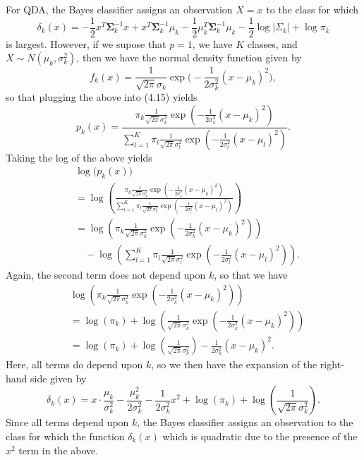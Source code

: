 For QDA, the Bayes classifier assigns an observation $X = x$ to the class for
which
\[
    \delta_k(x) = -\frac{1}{2}x^T \mathbf{\Sigma}_k^{-1}x
    + x^T \mathbf{\Sigma}_k^{-1}\mu_k
    - \frac{1}{2} \mu_k^T \mathbf{\Sigma}_k^{-1}\mu_k
    - \frac{1}{2}\log{\lvert \Sigma_k \rvert} + \log{\pi_k}
\]
is largest. However, if we supose that $p = 1$, we have $K$ classes, and
$X \sim N(\mu_k, \sigma_k^2)$, then we have the normal density function given
by
\[
    f_k(x) = \frac{1}{\sqrt{2\pi}\sigma_k}
    \exp{\biggl(-\frac{1}{2\sigma_k^2}{(x - \mu_k)}^2\biggr)},
\]
so that plugging the above into (4.15) yields
\[
    p_k(x) = \frac{\pi_k \frac{1}{\sqrt{2\pi}\sigma_k^2}
        \exp{\left(-\frac{1}{2\sigma_k^2}{(x - \mu_k)}^2\right)}}
        {\sum_{l=1}^K{\pi_l \frac{1}{\sqrt{2\pi}\sigma_l^2}
    \exp{\left(-\frac{1}{2\sigma_l^2}{(x - \mu_l)}^2\right)}}}.
\]
Taking the log of the above yields
\begin{equation*}
    \begin{split}
        & \log{\bigl(p_k(x)\bigr)} \\
        &= \log{\left(\frac{\pi_k \frac{1}{\sqrt{2\pi}\sigma_k^2}
                    \exp{\left(-\frac{1}{2\sigma_k^2}{(x - \mu_k)}^2\right)}}
                    {\sum_{l=1}^K{\pi_l \frac{1}{\sqrt{2\pi}\sigma_l^2}
        \exp{\left(-\frac{1}{2\sigma_l^2}{(x - \mu_l)}^2\right)}}}\right)} \\
        &= \log{\left(\pi_k \frac{1}{\sqrt{2\pi}\sigma_k^2}
        \exp{\left(-\frac{1}{2\sigma_k^2}{(x - \mu_k)}^2\right)}\right)} \\
        &\quad - \log{\left(\sum_{l=1}^K{\pi_l \frac{1}{\sqrt{2\pi}\sigma_l^2}
        \exp{\left(-\frac{1}{2\sigma_l^2}{(x - \mu_l)}^2\right)}}\right)}.
    \end{split}
\end{equation*}
Again, the second term does not depend upon $k$, so that we have
\begin{equation*}
    \begin{split}
        & \log{\left(\pi_k \frac{1}{\sqrt{2\pi}\sigma_k^2}
        \exp{\left(-\frac{1}{2\sigma_k^2}{(x - \mu_k)}^2\right)}\right)} \\
        &= \log{(\pi_k)} + \log{\left(\frac{1}{\sqrt{2\pi}\sigma_k^2}
        \exp{\left(-\frac{1}{2\sigma_k^2}{(x - \mu_k)}^2\right)}\right)} \\
        &= \log{(\pi_k)} + \log{\left(\frac{1}{\sqrt{2\pi}\sigma_k^2}\right)}
        - \frac{1}{2\sigma_k^2}{(x - \mu_k)}^2.
    \end{split}
\end{equation*}
Here, all terms do depend upon $k$, so we then have the expansion of the
right-hand side given by
\[
    \delta_k(x) = x \cdot \frac{\mu_k}{\sigma_k^2} - \frac{\mu_k^2}{2\sigma_k^2}
    - \frac{1}{2\sigma_k^2}x^2 + \log{(\pi_k)}
    + \log{\left(\frac{1}{\sqrt{2\pi}\sigma_k^2}\right)}.
\]
Since all terms depend upon $k$, the Bayes classifier assigns an observation to
the class for which the function $\delta_k(x)$ which is quadratic due to the
presence of the $x^2$ term in the above.
